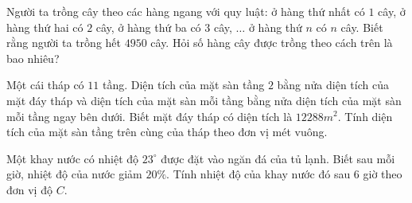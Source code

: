 \begin{bt}%
 
	Người ta trồng cây theo các hàng ngang với quy luật: ở hàng thứ nhất có $1$ cây, ở hàng thứ hai có $2$ cây, ở hàng thứ ba có $3$ cây, $\ldots$ ở hàng thứ $n$ có $n$ cây. Biết rằng người ta trồng hết $4950$ cây. Hỏi số hàng cây được trồng theo cách trên là bao nhiêu?
\end{bt}

\begin{bt}%
 
	Một cái tháp có $11$ tầng. Diện tích của mặt sàn tầng $2$ bằng nửa diện tích của mặt đáy tháp và diện tích của mặt sàn mỗi tầng bằng nửa diện tích của mặt sàn mỗi tầng ngay bên dưới. Biết mặt đáy tháp có diện tích là $12 288m^2$. Tính diện tích của mặt sàn tầng trên cùng của tháp theo đơn vị mét vuông.
\end{bt}

\begin{bt}%
 
	Một khay nước có nhiệt độ $23^\circ$ được đặt vào ngăn đá của tủ lạnh. Biết sau mỗi giờ, nhiệt độ của nước giảm $20\%$. Tính nhiệt độ của khay nước đó sau $6$ giờ theo đơn vị độ $C$.
	
\end{bt}

